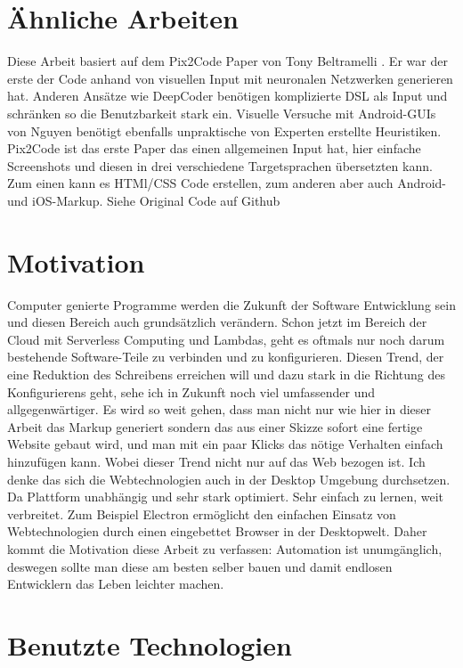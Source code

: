 \documentclass[pdftex,a4paper,halfparskip, article]{scrartcl}
\begin{document}
\section{Ähnliche Arbeiten}

Diese Arbeit basiert auf dem Pix2Code Paper von Tony Beltramelli \cite{Beltramelli17}. Er war der erste der Code anhand von visuellen Input mit neuronalen Netzwerken generieren hat. 
Anderen Ansätze wie DeepCoder \cite{DeepCoder16} benötigen komplizierte DSL als Input und schränken so die Benutzbarkeit stark ein. Visuelle Versuche mit Android-GUIs von Nguyen \cite{Nguyen15} benötigt ebenfalls unpraktische von Experten erstellte Heuristiken. Pix2Code ist das erste Paper das einen allgemeinen Input hat, hier einfache Screenshots und diesen in drei verschiedene Targetsprachen übersetzten kann. Zum einen kann es HTMl/CSS Code erstellen, zum anderen aber auch Android- und iOS-Markup. Siehe Original Code auf Github \cite{Beltramelli17Github}


\section{Motivation}

Computer genierte Programme werden die Zukunft der Software Entwicklung sein und diesen Bereich auch grundsätzlich verändern. Schon jetzt im Bereich der Cloud mit Serverless Computing und Lambdas, geht es oftmals nur noch darum bestehende Software-Teile zu verbinden und zu konfigurieren. Diesen Trend, der eine Reduktion des Schreibens erreichen will und dazu stark in die Richtung des Konfigurierens geht, sehe ich in Zukunft noch viel umfassender und allgegenwärtiger. Es wird so weit gehen, dass man nicht nur wie hier in dieser Arbeit das Markup generiert sondern das aus einer Skizze sofort eine fertige Website gebaut wird, und man mit ein paar Klicks das nötige Verhalten einfach hinzufügen kann. 
Wobei dieser Trend nicht nur auf das Web bezogen ist. Ich denke das sich die Webtechnologien auch in der Desktop Umgebung durchsetzen.  Da Plattform unabhängig und sehr stark optimiert. Sehr einfach zu lernen, weit verbreitet. Zum Beispiel Electron \cite{electron} ermöglicht den einfachen Einsatz von Webtechnologien durch einen eingebettet Browser in der Desktopwelt.
Daher kommt die Motivation diese Arbeit zu verfassen: Automation ist unumgänglich, deswegen sollte man diese am besten selber bauen und damit endlosen Entwicklern das Leben leichter machen.

\section{Benutzte Technologien}
\end{document}
